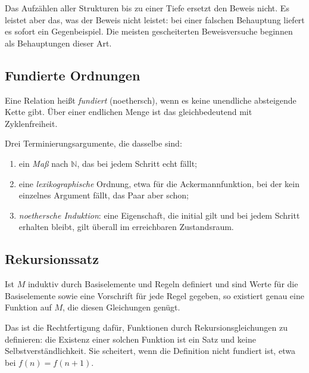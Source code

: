 \documentclass[12pt, a4paper]{article}
\begin{document}
\begin{notebox}
Das Aufzählen aller Strukturen bis zu einer Tiefe ersetzt den Beweis nicht.
Es leistet aber das, was der Beweis nicht leistet: bei einer falschen
Behauptung liefert es sofort ein Gegenbeispiel. Die meisten gescheiterten
Beweisversuche beginnen als Behauptungen dieser Art.
\end{notebox}

\subsection{Fundierte Ordnungen}

\begin{definitionbox}
Eine Relation heißt \emph{fundiert} (noethersch), wenn es keine unendliche
absteigende Kette gibt. Über einer endlichen Menge ist das gleichbedeutend
mit Zyklenfreiheit.
\end{definitionbox}

Drei Terminierungsargumente, die dasselbe sind:
\begin{enumerate}
  \item ein \emph{Maß} nach $\mathbb{N}$, das bei jedem Schritt echt fällt;
  \item eine \emph{lexikographische} Ordnung, etwa für die Ackermannfunktion,
        bei der kein einzelnes Argument fällt, das Paar aber schon;
  \item \emph{noethersche Induktion}: eine Eigenschaft, die initial gilt und
        bei jedem Schritt erhalten bleibt, gilt überall im erreichbaren
        Zustandsraum.
\end{enumerate}

\subsection{Rekursionssatz}

\begin{definitionbox}
Ist $M$ induktiv durch Basiselemente und Regeln definiert und sind Werte für
die Basiselemente sowie eine Vorschrift für jede Regel gegeben, so existiert
genau eine Funktion auf $M$, die diesen Gleichungen genügt.
\end{definitionbox}

Das ist die Rechtfertigung dafür, Funktionen durch Rekursionsgleichungen zu
definieren: die Existenz einer solchen Funktion ist ein Satz und keine
Selbstverständlichkeit. Sie scheitert, wenn die Definition nicht fundiert
ist, etwa bei $f(n) = f(n+1)$.
\end{document}
